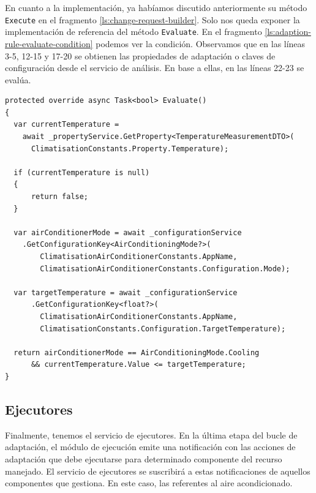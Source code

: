 En cuanto a la implementación, ya habíamos discutido anteriormente su método \texttt{Execute} en el fragmento \ref{ls:change-request-builder}. Solo nos queda exponer la implementación de referencia del método \texttt{Evaluate}. En el fragmento \ref{ls:adaption-rule-evaluate-condition} podemos ver la condición. Observamos que en las líneas 3-5, 12-15 y 17-20 se obtienen las propiedades de adaptación o claves de configuración desde el servicio de análisis. En base a ellas, en las líneas 22-23 se evalúa.

\pagebreak

\begin{lstlisting}[caption={Implementación de referencia del método \texttt{Evaluate}. La regla obtiene del conocimiento el estado actual del sistema y determina si debe ejecutarse.\protect\footnotemark},captionpos=b, label=ls:adaption-rule-evaluate-condition]
protected override async Task<bool> Evaluate()
{
  var currentTemperature =
    await _propertyService.GetProperty<TemperatureMeasurementDTO>(
      ClimatisationConstants.Property.Temperature);

  if (currentTemperature is null)
  {
      return false;
  }

  var airConditionerMode = await _configurationService
    .GetConfigurationKey<AirConditioningMode?>(
        ClimatisationAirConditionerConstants.AppName,
        ClimatisationAirConditionerConstants.Configuration.Mode);

  var targetTemperature = await _configurationService
      .GetConfigurationKey<float?>(
        ClimatisationAirConditionerConstants.AppName,
        ClimatisationConstants.Configuration.TargetTemperature);

  return airConditionerMode == AirConditioningMode.Cooling
      && currentTemperature.Value <= targetTemperature;
}
\end{lstlisting}


\subsection{Ejecutores}

Finalmente, tenemos el servicio de ejecutores. En la última etapa del bucle de adaptación, el módulo de ejecución emite una notificación con las acciones de adaptación que debe ejecutarse para determinado componente del recurso manejado. El servicio de ejecutores se suscribirá a estas notificaciones de aquellos componentes que gestiona. En este caso, las referentes al aire acondicionado.

